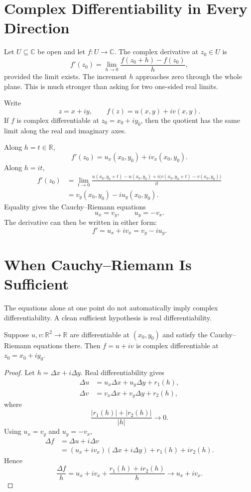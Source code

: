 
\section{Complex Differentiability in Every Direction}

Let \(U\subseteq\mathbb C\) be open and let \(f:U\to\mathbb C\).  The complex derivative at \(z_0\in U\) is
\[
  f'(z_0)
  =\lim_{h\to0}
  \frac{f(z_0+h)-f(z_0)}{h},
\]
provided the limit exists.  The increment \(h\) approaches zero through the whole plane.  This is much stronger than asking for two one-sided real limits.

Write
\[
  z=x+iy,
  \qquad
  f(z)=u(x,y)+iv(x,y).
\]
If \(f\) is complex differentiable at \(z_0=x_0+iy_0\), then the quotient has the same limit along the real and imaginary axes.

Along \(h=t\in\mathbb R\),
\[
  f'(z_0)
  =u_x(x_0,y_0)+iv_x(x_0,y_0).
\]
Along \(h=it\),
\[
\begin{aligned}
  f'(z_0)
  &=\lim_{t\to0}
  \frac{u(x_0,y_0+t)-u(x_0,y_0)
  +i\bigl(v(x_0,y_0+t)-v(x_0,y_0)\bigr)}{it}\\
  &=v_y(x_0,y_0)-iu_y(x_0,y_0).
\end{aligned}
\]
Equality gives the Cauchy--Riemann equations
\[
  \boxed{u_x=v_y,
  \qquad
  u_y=-v_x.}
\]
The derivative can then be written in either form:
\[
  f'=u_x+iv_x=v_y-iu_y.
\]

\section{When Cauchy--Riemann Is Sufficient}

The equations alone at one point do not automatically imply complex differentiability.  A clean sufficient hypothesis is real differentiability.

\begin{proposition}
Suppose \(u,v:\mathbb R^2\to\mathbb R\) are differentiable at \((x_0,y_0)\) and satisfy the Cauchy--Riemann equations there.  Then \(f=u+iv\) is complex differentiable at \(z_0=x_0+iy_0\).
\end{proposition}

\begin{proof}
Let \(h=\Delta x+i\Delta y\).  Real differentiability gives
\[
\begin{aligned}
  \Delta u&=u_x\Delta x+u_y\Delta y+r_1(h),\\
  \Delta v&=v_x\Delta x+v_y\Delta y+r_2(h),
\end{aligned}
\]
where
\[
  \frac{|r_1(h)|+|r_2(h)|}{|h|}\to0.
\]
Using \(u_x=v_y\) and \(u_y=-v_x\),
\[
\begin{aligned}
  \Delta f
  &=\Delta u+i\Delta v\\
  &=(u_x+iv_x)(\Delta x+i\Delta y)
  +r_1(h)+ir_2(h).
\end{aligned}
\]
Hence
\[
  \frac{\Delta f}{h}
  =u_x+iv_x+
  \frac{r_1(h)+ir_2(h)}{h}
  \longrightarrow u_x+iv_x.
\]
\end{proof}

